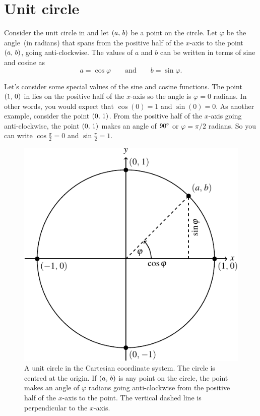 \documentclass[a4paper,oneside,12pt]{article}
\begin{document}

\section{Unit circle}

Consider the unit circle in  and let
$\left\lparen{a},\, {b}\right\rparen$ be a point on the circle.  Let $\varphi$ be the
angle~(in radians) that spans from the positive half of the $x$-axis
to the point $\left\lparen{a},\, {b}\right\rparen$, going anti-clockwise.  The values of $a$
and $b$ can be written in terms of sine and cosine as
\begin{equation}
\label{eqn:value_of_x_y_on_unit_circle}
a = \cos\varphi
\qquad\text{and}\qquad
b = \sin\varphi.
\end{equation}

Let's consider some special values of the sine and cosine functions.
The point $\left\lparen{1},\, {0}\right\rparen$ in  lies on
the positive half of the $x$-axis so the angle is $\varphi = 0$
radians.  In other words, you would expect that $\cos(0) = 1$ and
$\sin(0) = 0$.  As another example, consider the point $\left\lparen{0},\, {1}\right\rparen$.
From the positive half of the $x$-axis going anti-clockwise, the point
$\left\lparen{0},\, {1}\right\rparen$ makes an angle of ${90}^{\circ}$ or $\varphi = \pi / 2$
radians.  So you can write $\cos\frac{\pi}{2} = 0$ and
$\sin\frac{\pi}{2} = 1$.

\begin{figure}[!htbp]
\centering
\includegraphics[scale=1.1]{image/04/unit-circle.pdf}
\caption{%
  A unit circle in the Cartesian coordinate system.  The circle is
  centred at the origin.  If $\left\lparen{a},\, {b}\right\rparen$ is any point on the
  circle, the point makes an angle of $\varphi$ radians going
  anti-clockwise from the positive half of the $x$-axis to the point.
  The vertical dashed line is perpendicular to the $x$-axis.
}
\label{fig:point_on_unit_circle}
\end{figure}
\end{document}
